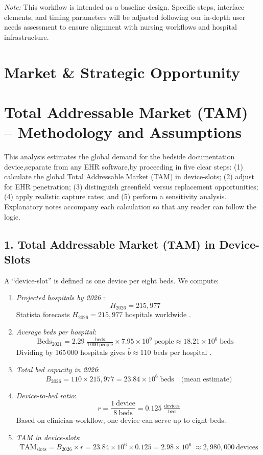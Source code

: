 \documentclass[a4paper,11pt]{article}
\begin{document}
\noindent\textit{Note:} This workflow is intended as a baseline design.  Specific steps, interface elements, and timing parameters will be adjusted following our in-depth user needs assessment to ensure alignment with nursing workflows and hospital infrastructure.  



\section{Market \& Strategic Opportunity}

\section{Total Addressable Market (TAM) – Methodology and Assumptions}

This analysis estimates the global demand for the bedside documentation device,separate from any EHR software,by proceeding in five clear steps:  
(1) calculate the global Total Addressable Market (TAM) in device-slots;  
(2) adjust for EHR penetration;  
(3) distinguish greenfield versus replacement opportunities;  
(4) apply realistic capture rates; and  
(5) perform a sensitivity analysis.  
Explanatory notes accompany each calculation so that any reader can follow the logic.

\subsection*{1. Total Addressable Market (TAM) in Device-Slots}

A “device-slot” is defined as one device per eight beds. We compute:

\begin{enumerate}
  \item \emph{Projected hospitals by 2026} \cite{NumberHospitalsWorldwide}:
    \[
      H_{2026} = 215{,}977
      \quad
    \]
    Statista forecasts \(H_{2026}=215{,}977\) hospitals worldwide \cite{HospitalBeds1000,nationsWorldPopulationDay}.
  \item \emph{Average beds per hospital}:
    \[
      \text{Beds}_{2021} = 2.29\;\tfrac{\text{beds}}{1\,000\ \text{people}}
      \times 7.95\times10^{9}\;\text{people}
      \approx 18.21\times10^{6}\;\text{beds}
      \quad
    \]
    Dividing by 165\,000 hospitals gives \(\bar b\approx110\) beds per hospital \cite{85HospitalStatistics}.
  \item \emph{Total bed capacity in 2026}:
    \[
      B_{2026}
      = 110 \times 215{,}977
      = 23.84\times10^{6}\;\text{beds}
      \quad\text{(mean estimate)}
    \]
  \item \emph{Device-to-bed ratio}:
    \[
      r = \frac{1\ \text{device}}{8\ \text{beds}} = 0.125\;\tfrac{\text{devices}}{\text{bed}}
    \]
    Based on clinician workflow, one device can serve up to eight beds.
  \item \emph{TAM in device-slots}:
    \[
      \mathrm{TAM}_{\mathrm{slots}}
      = B_{2026} \times r
      = 23.84\times10^{6} \times 0.125
      = 2.98\times10^{6}
      \;\approx2{,}980{,}000\ \text{devices}
    \]

\end{enumerate}
\end{document}

